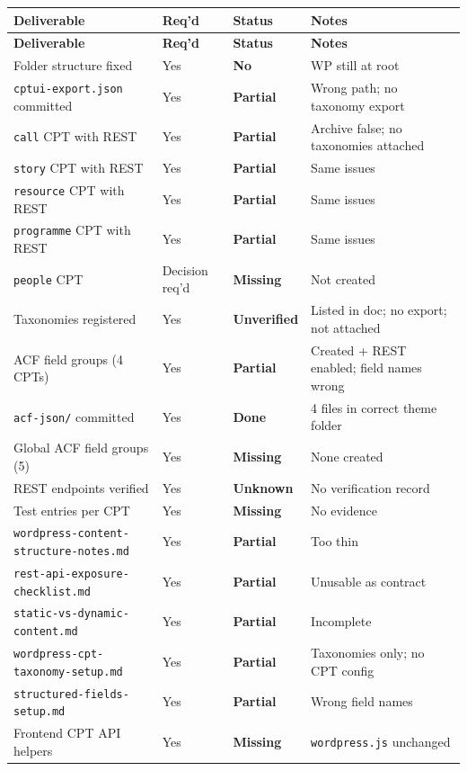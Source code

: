 \documentclass[12pt,a4paper]{article}
\begin{document}
\begin{longtable}{@{}p{5.2cm}p{1.4cm}p{2.2cm}p{3.5cm}@{}}
\toprule
\rowcolor{uvtLightBlue}
\textbf{Deliverable} & \textbf{Req'd} & \textbf{Status} & \textbf{Notes} \\
\midrule
\endfirsthead
\toprule
\rowcolor{uvtLightBlue}
\textbf{Deliverable} & \textbf{Req'd} & \textbf{Status} & \textbf{Notes} \\
\midrule
\endhead
\bottomrule
\endfoot
Folder structure fixed & Yes & \textcolor{statusRed}{\textbf{No}} & WP still at root \\
\texttt{cptui-export.json} committed & Yes & \textcolor{statusOrange}{\textbf{Partial}} & Wrong path; no taxonomy export \\
\texttt{call} CPT with REST & Yes & \textcolor{statusOrange}{\textbf{Partial}} & Archive false; no taxonomies attached \\
\texttt{story} CPT with REST & Yes & \textcolor{statusOrange}{\textbf{Partial}} & Same issues \\
\texttt{resource} CPT with REST & Yes & \textcolor{statusOrange}{\textbf{Partial}} & Same issues \\
\texttt{programme} CPT with REST & Yes & \textcolor{statusOrange}{\textbf{Partial}} & Same issues \\
\texttt{people} CPT & Decision req'd & \textcolor{statusRed}{\textbf{Missing}} & Not created \\
Taxonomies registered & Yes & \textcolor{statusOrange}{\textbf{Unverified}} & Listed in doc; no export; not attached \\
ACF field groups (4 CPTs) & Yes & \textcolor{statusOrange}{\textbf{Partial}} & Created + REST enabled; field names wrong \\
\texttt{acf-json/} committed & Yes & \textcolor{statusGreen}{\textbf{Done}} & 4 files in correct theme folder \\
Global ACF field groups (5) & Yes & \textcolor{statusRed}{\textbf{Missing}} & None created \\
REST endpoints verified & Yes & \textcolor{statusRed}{\textbf{Unknown}} & No verification record \\
Test entries per CPT & Yes & \textcolor{statusRed}{\textbf{Missing}} & No evidence \\
\texttt{wordpress-content-structure-notes.md} & Yes & \textcolor{statusOrange}{\textbf{Partial}} & Too thin \\
\texttt{rest-api-exposure-checklist.md} & Yes & \textcolor{statusOrange}{\textbf{Partial}} & Unusable as contract \\
\texttt{static-vs-dynamic-content.md} & Yes & \textcolor{statusOrange}{\textbf{Partial}} & Incomplete \\
\texttt{wordpress-cpt-taxonomy-setup.md} & Yes & \textcolor{statusOrange}{\textbf{Partial}} & Taxonomies only; no CPT config \\
\texttt{structured-fields-setup.md} & Yes & \textcolor{statusOrange}{\textbf{Partial}} & Wrong field names \\
Frontend CPT API helpers & Yes & \textcolor{statusRed}{\textbf{Missing}} & \texttt{wordpress.js} unchanged \\
\end{longtable}
\end{document}

